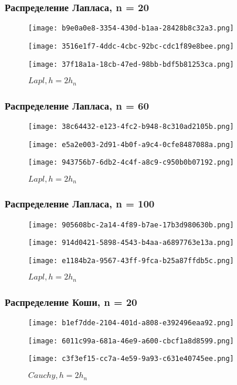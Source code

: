 \subsubsection{Распределение Лапласа, n = 20}
\begin{figure}[!htb]
  \texttt{[image: b9e0a0e8-3354-430d-b1aa-28428b8c32a3.png]}
  \caption{\(Lapl, h=h_n/2\)}
\endminipage\hfill
{}
  \texttt{[image: 3516e1f7-4ddc-4cbc-92bc-cdc1f89e8bee.png]}
  \caption{\(Lapl, h=h_n\)}
\endminipage\hfill
{}
  \texttt{[image: 37f18a1a-18cb-47ed-98bb-bdf5b81253ca.png]}
  \caption{\(Lapl, h=2h_n\)}
\endminipage
 \label{fig:lapl20}
\end{figure}
\subsubsection{Распределение Лапласа, n = 60}
\begin{figure}[!htb]
  \texttt{[image: 38c64432-e123-4fc2-b948-8c310ad2105b.png]}
  \caption{\(Lapl, h=h_n/2\)}
\endminipage\hfill
{}
  \texttt{[image: e5a2e003-2d91-4b0f-a9c4-0cfe8487088a.png]}
  \caption{\(Lapl, h=h_n\)}
\endminipage\hfill
{}
  \texttt{[image: 943756b7-6db2-4c4f-a8c9-c950b0b07192.png]}
  \caption{\(Lapl, h=2h_n\)}
\endminipage
 \label{fig:lapl60}
\end{figure}
\subsubsection{Распределение Лапласа, n = 100}
\begin{figure}[!htb]
  \texttt{[image: 905608bc-2a14-4f89-b7ae-17b3d980630b.png]}
  \caption{\(Lapl, h=h_n/2\)}
\endminipage\hfill
{}
  \texttt{[image: 914d0421-5898-4543-b4aa-a6897763e13a.png]}
  \caption{\(Lapl, h=h_n\)}
\endminipage\hfill
{}
  \texttt{[image: e1184b2a-9567-43ff-9fca-b25a87ffdb5c.png]}
  \caption{\(Lapl, h=2h_n\)}
\endminipage
 \label{fig:lapl100}
\end{figure}
\newpage
\subsubsection{Распределение Коши, n = 20}
\begin{figure}[!htb]
  \texttt{[image: b1ef7dde-2104-401d-a808-e392496eaa92.png]}
  \caption{\(Cauchy, h=h_n/2\)}
\endminipage\hfill
{}
  \texttt{[image: 6011c99a-681a-46e9-a600-cbcf1a8d8599.png]}
  \caption{\(Cauchy, h=h_n\)}
\endminipage\hfill
{}
  \texttt{[image: c3f3ef15-cc7a-4e59-9a93-c631e40745ee.png]}
  \caption{\(Cauchy, h=2h_n\)}
\endminipage
\label{fig:cauch20}
\end{figure}
